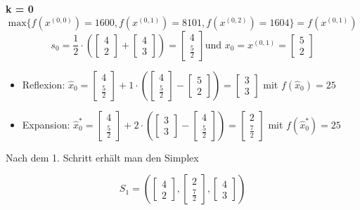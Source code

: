 \documentclass[a4paper, 12pt]{report}
\begin{document}
\textbf{k = 0}\\
$$\text{max}\{f(x^{(0,0)}) = 1600, f(x^{(0,1)}) = 8101, f(x^{(0,2)}) = 1604\} = f(x^{(0,1)})$$
$$s_0 = \frac{1}{2}\cdot (\begin{bmatrix}4\\2\end{bmatrix} + \begin{bmatrix}4\\3\end{bmatrix}) = \begin{bmatrix}4\\\frac{5}{2}\end{bmatrix} \text{und } x_0 = x^{(0,1)} = \begin{bmatrix}5\\2\end{bmatrix}$$
\begin{itemize}
\item Reflexion: $\hat x_0 = \begin{bmatrix}4\\\frac{5}{2}\end{bmatrix} + 1\cdot(\begin{bmatrix}4\\\frac{5}{2}\end{bmatrix} - \begin{bmatrix}5\\2\end{bmatrix}) = \begin{bmatrix}3\\3\end{bmatrix}$ mit $f(\hat x_0) = 25$
\item Expansion: $\hat x_0^* = \begin{bmatrix}4\\\frac{5}{2}\end{bmatrix} + 2\cdot (\begin{bmatrix}3\\3\end{bmatrix} - \begin{bmatrix}4\\\frac{5}{2}\end{bmatrix}) = \begin{bmatrix}2\\\frac{7}{2}\end{bmatrix}$ mit $f(\hat x_0^*) = 25$
\end{itemize}

Nach dem 1. Schritt erhält man den Simplex

$$S_1 = (\begin{bmatrix}4\\2\end{bmatrix}, \begin{bmatrix}2\\\frac{7}{2}\end{bmatrix}, \begin{bmatrix}4\\3\end{bmatrix})$$
\end{document}
